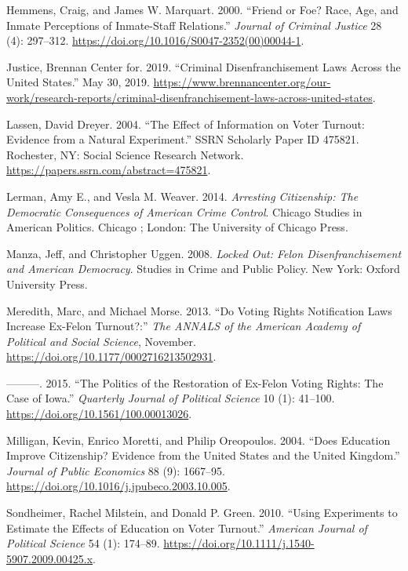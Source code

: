 \documentclass[
  12pt,
]{article}
\newlength{\cslhangindent}
\newenvironment{cslreferences}%
  {\setlength{\parindent}{0pt}%
  \everypar{\setlength{\hangindent}{\cslhangindent}}\ignorespaces}%
  {\par}
\begin{document}
\begin{cslreferences}
\leavevmode\hypertarget{ref-Hemmens2000}{}%
Hemmens, Craig, and James W. Marquart. 2000. ``Friend or Foe? Race, Age, and Inmate Perceptions of Inmate-Staff Relations.'' \emph{Journal of Criminal Justice} 28 (4): 297--312. \url{https://doi.org/10.1016/S0047-2352(00)00044-1}.

\leavevmode\hypertarget{ref-bcj_laws}{}%
Justice, Brennan Center for. 2019. ``Criminal Disenfranchisement Laws Across the United States.'' May 30, 2019. \url{https://www.brennancenter.org/our-work/research-reports/criminal-disenfranchisement-laws-across-united-states}.

\leavevmode\hypertarget{ref-Lassen2004}{}%
Lassen, David Dreyer. 2004. ``The Effect of Information on Voter Turnout: Evidence from a Natural Experiment.'' SSRN Scholarly Paper ID 475821. Rochester, NY: Social Science Research Network. \url{https://papers.ssrn.com/abstract=475821}.

\leavevmode\hypertarget{ref-Lerman2014}{}%
Lerman, Amy E., and Vesla M. Weaver. 2014. \emph{Arresting Citizenship: The Democratic Consequences of American Crime Control}. Chicago Studies in American Politics. Chicago ; London: The University of Chicago Press.

\leavevmode\hypertarget{ref-locked_out}{}%
Manza, Jeff, and Christopher Uggen. 2008. \emph{Locked Out: Felon Disenfranchisement and American Democracy}. Studies in Crime and Public Policy. New York: Oxford University Press.

\leavevmode\hypertarget{ref-Meredith2013}{}%
Meredith, Marc, and Michael Morse. 2013. ``Do Voting Rights Notification Laws Increase Ex-Felon Turnout?:'' \emph{The ANNALS of the American Academy of Political and Social Science}, November. \url{https://doi.org/10.1177/0002716213502931}.

\leavevmode\hypertarget{ref-Meredith2015}{}%
---------. 2015. ``The Politics of the Restoration of Ex-Felon Voting Rights: The Case of Iowa.'' \emph{Quarterly Journal of Political Science} 10 (1): 41--100. \url{https://doi.org/10.1561/100.00013026}.

\leavevmode\hypertarget{ref-Milligan2004}{}%
Milligan, Kevin, Enrico Moretti, and Philip Oreopoulos. 2004. ``Does Education Improve Citizenship? Evidence from the United States and the United Kingdom.'' \emph{Journal of Public Economics} 88 (9): 1667--95. \url{https://doi.org/10.1016/j.jpubeco.2003.10.005}.

\leavevmode\hypertarget{ref-Sondheimer2010}{}%
Sondheimer, Rachel Milstein, and Donald P. Green. 2010. ``Using Experiments to Estimate the Effects of Education on Voter Turnout.'' \emph{American Journal of Political Science} 54 (1): 174--89. \url{https://doi.org/10.1111/j.1540-5907.2009.00425.x}.


\end{cslreferences}
\end{document}
